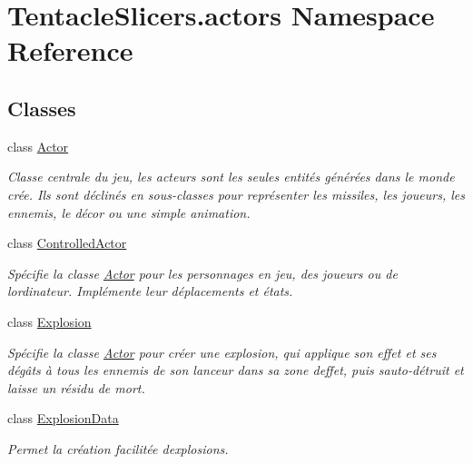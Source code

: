 \hypertarget{namespace_tentacle_slicers_1_1actors}{}\section{Tentacle\+Slicers.\+actors Namespace Reference}
\label{namespace_tentacle_slicers_1_1actors}
\subsection*{Classes}
\begin{DoxyCompactItemize}
\item 
class \hyperlink{class_tentacle_slicers_1_1actors_1_1_actor}{Actor}
\begin{DoxyCompactList}\small\item\em Classe centrale du jeu, les acteurs sont les seules entités générées dans le monde crée. Ils sont déclinés en sous-\/classes pour représenter les missiles, les joueurs, les ennemis, le décor ou une simple animation. \end{DoxyCompactList}\item 
class \hyperlink{class_tentacle_slicers_1_1actors_1_1_controlled_actor}{Controlled\+Actor}
\begin{DoxyCompactList}\small\item\em Spécifie la classe \hyperlink{class_tentacle_slicers_1_1actors_1_1_actor}{Actor} pour les personnages en jeu, des joueurs ou de l\textquotesingle{}ordinateur. Implémente leur déplacements et états. \end{DoxyCompactList}\item 
class \hyperlink{class_tentacle_slicers_1_1actors_1_1_explosion}{Explosion}
\begin{DoxyCompactList}\small\item\em Spécifie la classe \hyperlink{class_tentacle_slicers_1_1actors_1_1_actor}{Actor} pour créer une explosion, qui applique son effet et ses dégâts à tous les ennemis de son lanceur dans sa zone d\textquotesingle{}effet, puis s\textquotesingle{}auto-\/détruit et laisse un résidu de mort. \end{DoxyCompactList}\item 
class \hyperlink{class_tentacle_slicers_1_1actors_1_1_explosion_data}{Explosion\+Data}
\begin{DoxyCompactList}\small\item\em Permet la création facilitée d\textquotesingle{}explosions. \end{DoxyCompactList}\item 

\end{DoxyCompactItemize}
